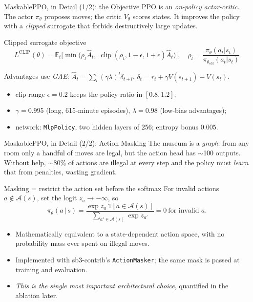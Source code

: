 \documentclass[aspectratio=169, 11pt]{beamer}
\newcommand{\emp}[1]{\textit{#1}}
\newcommand{\code}[1]{\texttt{\small #1}}
\begin{document}
\begin{frame}{MaskablePPO, in Detail (1/2): the Objective}
\footnotesize
PPO is an \emp{on-policy actor-critic}. The actor $\pi_\theta$ proposes moves; the critic
$V_\theta$ scores states. It improves the policy with a \emp{clipped} surrogate that
forbids destructively large updates.
\begin{block}{Clipped surrogate objective}
\[
L^{\text{CLIP}}(\theta)=\mathbb{E}_t\!\Big[\min\big(\rho_t\hat A_t,\;\operatorname{clip}(\rho_t,1-\epsilon,1+\epsilon)\hat A_t\big)\Big],
\quad \rho_t=\frac{\pi_\theta(a_t|s_t)}{\pi_{\theta_{\text{old}}}(a_t|s_t)}
\]
\end{block}
\vspace{-0.3em}
Advantages use \emp{GAE}: $\hat A_t=\sum_l(\gamma\lambda)^l\delta_{t+l}$,
$\delta_t=r_t+\gamma V(s_{t+1})-V(s_t)$.
\begin{itemize}\setlength\itemsep{1pt}
\item clip range $\epsilon=0.2$ keeps the policy ratio in $[0.8,1.2]$;
\item $\gamma=0.995$ (long, 615-minute episodes), $\lambda=0.98$ (low-bias advantages);
\item network: \code{MlpPolicy}, two hidden layers of 256; entropy bonus $0.005$.
\end{itemize}
\end{frame}

\begin{frame}{MaskablePPO, in Detail (2/2): Action Masking}
\footnotesize
The museum is a \emp{graph}: from any room only a handful of moves are legal, but the
action head has $\sim$100 outputs. Without help, $\sim$80\% of actions are illegal at
every step and the policy must \emp{learn} that from penalties, wasting gradient.
\begin{block}{Masking = restrict the action set before the softmax}
For invalid actions $a\notin\mathcal{A}(s)$, set the logit $z_a\to-\infty$, so
\[
\pi_\theta(a\,|\,s)=\frac{\exp z_a\,\mathbb{1}[a\in\mathcal{A}(s)]}{\sum_{a'\in\mathcal{A}(s)}\exp z_{a'}}=0\ \text{for invalid }a.
\]
\end{block}
\vspace{-0.2em}
\begin{itemize}\setlength\itemsep{1pt}
\item Mathematically equivalent to a state-dependent action space, with no probability
      mass ever spent on illegal moves.
\item Implemented with sb3-contrib's \code{ActionMasker}; the same mask is passed at
      training and evaluation.
\item \emp{This is the single most important architectural choice}, quantified in the
      ablation later.
\end{itemize}
\end{frame}
\end{document}
